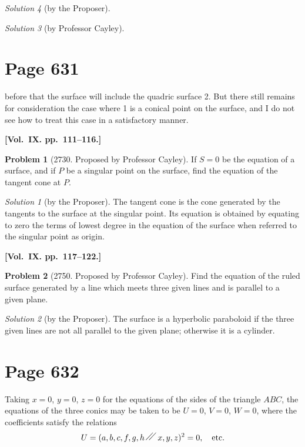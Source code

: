 \documentclass[12pt,a4paper]{article}
\theoremstyle{plain}
\theoremstyle{definition}
\newtheorem{problem}{Problem}
\theoremstyle{remark}
\newtheorem*{solution}{Solution}
\begin{document}
\begin{solution}[by the Proposer]
\begin{solution}[by Professor Cayley]
\section*{Page 631}
\setcounter{page}{631}

before that the surface will include the quadric surface 2. But there still remains for consideration the case where 1 is a conical point on the surface, and I do not see how to treat this case in a satisfactory manner.

\medskip\noindent\textbf{[Vol.~IX. pp.~111--116.]}

\begin{problem}[2730. Proposed by Professor Cayley]
If $S = 0$ be the equation of a surface, and if $P$ be a singular point on the surface, find the equation of the tangent cone at $P$.
\end{problem}

\begin{solution}[by the Proposer]
The tangent cone is the cone generated by the tangents to the surface at the singular point. Its equation is obtained by equating to zero the terms of lowest degree in the equation of the surface when referred to the singular point as origin.
\end{solution}

\medskip\noindent\textbf{[Vol.~IX. pp.~117--122.]}

\begin{problem}[2750. Proposed by Professor Cayley]
Find the equation of the ruled surface generated by a line which meets three given lines and is parallel to a given plane.
\end{problem}

\begin{solution}[by the Proposer]
The surface is a hyperbolic paraboloid if the three given lines are not all parallel to the given plane; otherwise it is a cylinder.
\end{solution}

\section*{Page 632}
\setcounter{page}{632}

Taking $x = 0$, $y = 0$, $z = 0$ for the equations of the sides of the triangle $ABC$, the equations of the three conics may be taken to be $U = 0$, $V = 0$, $W = 0$, where the coefficients satisfy the relations
\[
U = (a, b, c, f, g, h \,\raisebox{0.5ex}{\ensuremath{\diagup\kern-0.5em\diagup}}\, x, y, z)^2 = 0, \quad \text{etc.}
\]


\end{solution}
\end{solution}
\end{document}
